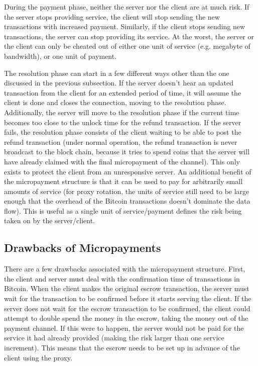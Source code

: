 During the payment phase, neither the server nor the client are at much risk. If the server stops providing service, the client will stop sending the new transactions with increased payment. Similarly, if the client stops sending new transactions, the server can stop providing its service. At the worst, the server or the client can only be cheated out of either one unit of service (e.g. megabyte of bandwidth), or one unit of payment.

The resolution phase can start in a few different ways other than the one discussed in the previous subsection. If the server doesn't hear an updated transaction from the client for an extended period of time, it will assume the client is done and closes the connection, moving to the resolution phase. Additionally, the server will move to the resolution phase if the current time becomes too close to the unlock time for the refund transaction. If the server fails, the resolution phase consists of the client waiting to be able to post the refund transaction (under normal operation, the refund transaction is never broadcast to the block chain, because it tries to spend coins that the server will have already claimed with the final micropayment of the channel). This only exists to protect the client from an unresponsive server. An additional benefit of the micropayment structure is that it can be used to pay for arbitrarily small amounts of service (for proxy rotation, the units of service still need to be large enough that the overhead of the Bitcoin transactions doesn't dominate the data flow). This is useful as a single unit of service/payment defines the risk being taken on by the server/client.

\subsection{Drawbacks of Micropayments}

There are a few drawbacks associated with the micropayment structure. First, 
the client and server must deal with the confirmation time of transactions in Bitcoin. When the client makes the original escrow transaction, the server must wait for the transaction to be confirmed before it starts serving the client. If the server does not wait for the escrow transaction to be confirmed, the client could attempt to double spend the money in the escrow, taking the money out of the payment channel. If this were to happen, the server would not be paid for the service it had already provided (making the risk larger than one service increment). This means that the escrow needs to be set up in advance of the client using the proxy. 

